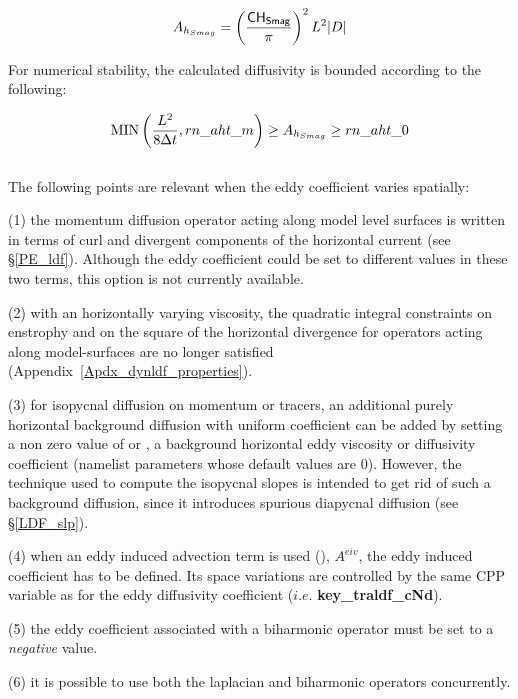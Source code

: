 \documentclass[NEMO_book]{subfiles}
\begin{document}
\begin{equation}
A_{h_{Smag}} = \left(\frac{{\sf CH_{Smag}}}{\pi}\right)^2L^2\vert{D}\vert
\end{equation}

 
For numerical stability, the calculated diffusivity is bounded according to the following:

\begin{equation}
{\rm MIN}\left ({ L^2\over {8\Delta{t}}}, rn\_aht\_m\right ) \geq A_{h_{Smag}} 
                                                             \geq rn\_aht\_0
\end{equation}



$\ $\newline    %

The following points are relevant when the eddy coefficient varies spatially:

(1) the momentum diffusion operator acting along model level surfaces is 
written in terms of curl and divergent components of the horizontal current 
(see \S\ref{PE_ldf}). Although the eddy coefficient could be set to different values 
in these two terms, this option is not currently available. 

(2) with an horizontally varying viscosity, the quadratic integral constraints 
on enstrophy and on the square of the horizontal divergence for operators 
acting along model-surfaces are no longer satisfied 
(Appendix~\ref{Apdx_dynldf_properties}).

(3) for isopycnal diffusion on momentum or tracers, an additional purely 
horizontal background diffusion with uniform coefficient can be added by 
setting a non zero value of  or , a background horizontal 
eddy viscosity or diffusivity coefficient (namelist parameters whose default 
values are $0$). However, the technique used to compute the isopycnal 
slopes is intended to get rid of such a background diffusion, since it introduces 
spurious diapycnal diffusion (see \S\ref{LDF_slp}).

(4) when an eddy induced advection term is used (), $A^{eiv}$, 
the eddy induced coefficient has to be defined. Its space variations are controlled 
by the same CPP variable as for the eddy diffusivity coefficient ($i.e.$ 
\textbf{key\_traldf\_cNd}). 

(5) the eddy coefficient associated with a biharmonic operator must be set to a \emph{negative} value.

(6) it is possible to use both the laplacian and biharmonic operators concurrently.
\end{document}
